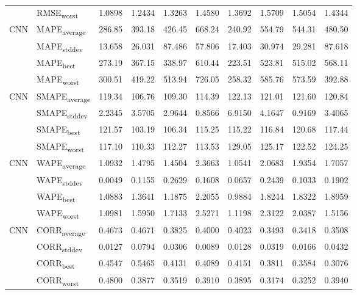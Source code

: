 {\begin{longtable}{l l c c c c c c c c}
 & RMSE\textsubscript{worst} & 1.0898 & 1.2434 & 1.3263 & 1.4580 & 1.3692 & 1.5709 & 1.5054 & 1.4344 \\
\cmidrule(lr){2-10}
\multirow{4}{*}{CNN} & MAPE\textsubscript{average} & 286.85 & 393.18 & 426.45 & 668.24 & 240.92 & 554.79 & 544.31 & 480.50 \\
 & MAPE\textsubscript{stddev} & 13.658 & 26.031 & 87.486 & 57.806 & 17.403 & 30.974 & 29.281 & 87.618 \\
 & MAPE\textsubscript{best} & 273.19 & 367.15 & 338.97 & 610.44 & 223.51 & 523.81 & 515.02 & 568.11 \\
 & MAPE\textsubscript{worst} & 300.51 & 419.22 & 513.94 & 726.05 & 258.32 & 585.76 & 573.59 & 392.88 \\
\cmidrule(lr){2-10}
\multirow{4}{*}{CNN} & SMAPE\textsubscript{average} & 119.34 & 106.76 & 109.30 & 114.39 & 122.13 & 121.01 & 121.60 & 120.84 \\
 & SMAPE\textsubscript{stddev} & 2.2345 & 3.5705 & 2.9644 & 0.8566 & 6.9150 & 4.1647 & 0.9169 & 3.4065 \\
 & SMAPE\textsubscript{best} & 121.57 & 103.19 & 106.34 & 115.25 & 115.22 & 116.84 & 120.68 & 117.44 \\
 & SMAPE\textsubscript{worst} & 117.10 & 110.33 & 112.27 & 113.53 & 129.05 & 125.17 & 122.52 & 124.25 \\
\cmidrule(lr){2-10}
\multirow{4}{*}{CNN} & WAPE\textsubscript{average} & 1.0932 & 1.4795 & 1.4504 & 2.3663 & 1.0541 & 2.0683 & 1.9354 & 1.7057 \\
 & WAPE\textsubscript{stddev} & 0.0049 & 0.1155 & 0.2629 & 0.1608 & 0.0657 & 0.2439 & 0.1033 & 0.1902 \\
 & WAPE\textsubscript{best} & 1.0883 & 1.3641 & 1.1875 & 2.2055 & 0.9884 & 1.8244 & 1.8322 & 1.8959 \\
 & WAPE\textsubscript{worst} & 1.0981 & 1.5950 & 1.7133 & 2.5271 & 1.1198 & 2.3122 & 2.0387 & 1.5156 \\
\cmidrule(lr){2-10}
\multirow{4}{*}{CNN} & CORR\textsubscript{average} & 0.4673 & 0.4671 & 0.3825 & 0.4000 & 0.4023 & 0.3493 & 0.3418 & 0.3508 \\
 & CORR\textsubscript{stddev} & 0.0127 & 0.0794 & 0.0306 & 0.0089 & 0.0128 & 0.0319 & 0.0166 & 0.0432 \\
 & CORR\textsubscript{best} & 0.4547 & 0.5465 & 0.4131 & 0.4089 & 0.4151 & 0.3811 & 0.3584 & 0.3076 \\
 & CORR\textsubscript{worst} & 0.4800 & 0.3877 & 0.3519 & 0.3910 & 0.3895 & 0.3174 & 0.3252 & 0.3940 \\

\end{longtable}}
